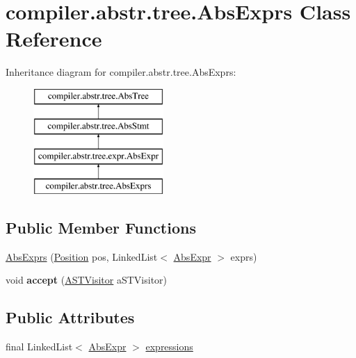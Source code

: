 \hypertarget{classcompiler_1_1abstr_1_1tree_1_1_abs_exprs}{}\section{compiler.\+abstr.\+tree.\+Abs\+Exprs Class Reference}
\label{classcompiler_1_1abstr_1_1tree_1_1_abs_exprs}
Inheritance diagram for compiler.\+abstr.\+tree.\+Abs\+Exprs\+:\begin{figure}[H]
\begin{center}
\leavevmode
\includegraphics[height=4.000000cm]{classcompiler_1_1abstr_1_1tree_1_1_abs_exprs}
\end{center}
\end{figure}
\subsection*{Public Member Functions}
\begin{DoxyCompactItemize}
\item 
\hyperlink{classcompiler_1_1abstr_1_1tree_1_1_abs_exprs_a5672add36839981ae6ce3d7709db7518}{Abs\+Exprs} (\hyperlink{classcompiler_1_1_position}{Position} pos, Linked\+List$<$ \hyperlink{classcompiler_1_1abstr_1_1tree_1_1expr_1_1_abs_expr}{Abs\+Expr} $>$ exprs)
\item 
\mbox{\label{classcompiler_1_1abstr_1_1tree_1_1_abs_exprs_a8f2e0c119818d87b6acdbe65d8489526}} 
void {\bfseries accept} (\hyperlink{interfacecompiler_1_1abstr_1_1_a_s_t_visitor}{A\+S\+T\+Visitor} a\+S\+T\+Visitor)
\end{DoxyCompactItemize}
\subsection*{Public Attributes}
\begin{DoxyCompactItemize}
\item 
final Linked\+List$<$ \hyperlink{classcompiler_1_1abstr_1_1tree_1_1expr_1_1_abs_expr}{Abs\+Expr} $>$ \hyperlink{classcompiler_1_1abstr_1_1tree_1_1_abs_exprs_a4af862f69f6efc24fc2421ec5470a412}{expressions}
\end{DoxyCompactItemize}


